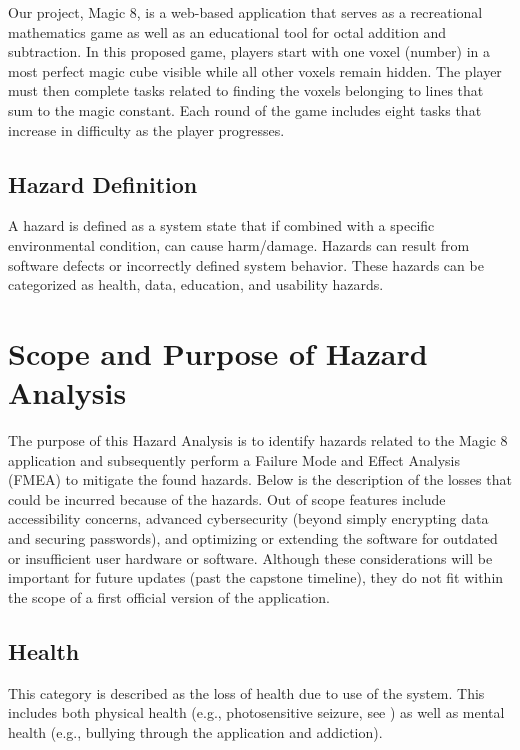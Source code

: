 \documentclass{article}
\begin{document}
Our project, Magic 8, is a web-based application that serves as a recreational mathematics game as well as an educational tool for octal addition and subtraction. In this proposed game, players start with one voxel (number) in a most perfect magic cube visible while all other voxels remain hidden. The player must then complete tasks related to finding the voxels belonging to lines that sum to the magic constant. Each round of the game includes eight tasks that increase in difficulty as the player progresses.

\subsection{Hazard Definition}

A hazard is defined as a system state that if combined with a specific environmental condition, can cause harm/damage. Hazards can result from software defects or incorrectly defined system behavior. These hazards can be categorized as health, data, education, and usability hazards.

\section{Scope and Purpose of Hazard Analysis}\label{sec:ScopeandPurpose}

The purpose of this Hazard Analysis is to identify hazards related to the Magic 8 application and subsequently perform a Failure Mode and Effect Analysis (FMEA) to mitigate the found hazards. Below is the description of the losses that could be incurred because of the hazards. Out of scope features include accessibility concerns, advanced cybersecurity (beyond simply encrypting data and securing passwords), and optimizing or extending the software for outdated or insufficient user hardware or software. Although these considerations will be important for future updates (past the capstone timeline), they do not fit within the scope of a first official version of the application.

\subsection{Health}

This category is described as the loss of health due to use of the system. This includes both physical health (e.g., photosensitive seizure, see \citet{PhotoSeizure}) as well as mental health (e.g., bullying through the application and addiction).
\end{document}
